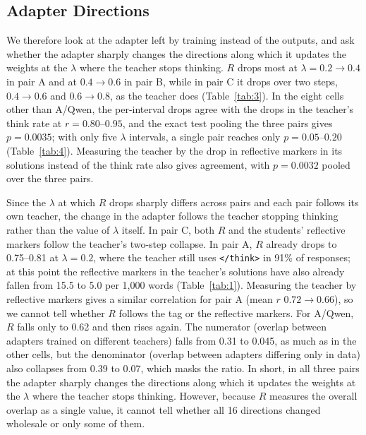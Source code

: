 \begin{table}[t]
\centering
\small
\resizebox{\linewidth}{!}{}
\caption{MATH-500 response length, truncation rate, and accuracy change (pp) of the $\lambda=0$ and $\lambda=1$ students. The accuracy change is reported both over all responses and with only completed responses scored. The release from truncation as responses become shorter alone explains most of the accuracy gain. Values after $\pm$ are standard deviations across three seeds.}
\label{tab:2}
\end{table}

\subsection{Adapter Directions}\label{sec:directions}

We therefore look at the adapter left by training instead of the outputs, and ask whether the adapter sharply changes the directions along which it updates the weights at the $\lambda$ where the teacher stops thinking.
$R$ drops most at $\lambda = 0.2 \to 0.4$ in pair A and at $0.4 \to 0.6$ in pair B, while in pair C it drops over two steps, $0.4 \to 0.6$ and $0.6 \to 0.8$, as the teacher does (Table~\ref{tab:3}).
In the eight cells other than A/Qwen, the per-interval drops agree with the drops in the teacher's think rate at $r = 0.80$--$0.95$, and the exact test pooling the three pairs gives $p = 0.0035$; with only five $\lambda$ intervals, a single pair reaches only $p = 0.05$--$0.20$ (Table~\ref{tab:4}).
Measuring the teacher by the drop in reflective markers in its solutions instead of the think rate also gives agreement, with $p = 0.0032$ pooled over the three pairs.

Since the $\lambda$ at which $R$ drops sharply differs across pairs and each pair follows its own teacher, the change in the adapter follows the teacher stopping thinking rather than the value of $\lambda$ itself.
In pair C, both $R$ and the students' reflective markers follow the teacher's two-step collapse.
In pair A, $R$ already drops to 0.75--0.81 at $\lambda=0.2$, where the teacher still uses \texttt{</think>} in 91\% of responses; at this point the reflective markers in the teacher's solutions have also already fallen from 15.5 to 5.0 per 1,000 words (Table~\ref{tab:1}).
Measuring the teacher by reflective markers gives a similar correlation for pair A (mean $r$ $0.72 \to 0.66$), so we cannot tell whether $R$ follows the tag or the reflective markers.
For A/Qwen, $R$ falls only to 0.62 and then rises again.
The numerator (overlap between adapters trained on different teachers) falls from 0.31 to 0.045, as much as in the other cells, but the denominator (overlap between adapters differing only in data) also collapses from 0.39 to 0.07, which masks the ratio.
In short, in all three pairs the adapter sharply changes the directions along which it updates the weights at the $\lambda$ where the teacher stops thinking.
However, because $R$ measures the overall overlap as a single value, it cannot tell whether all 16 directions changed wholesale or only some of them.

